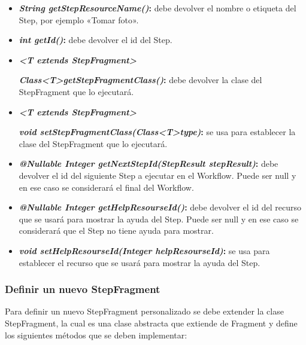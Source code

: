 \begin{itemize} 
  \item \textbf{\textit{String getStepResourceName()}:} debe devolver el nombre o etiqueta del Step, por ejemplo «Tomar foto».
  
  \item \textbf{\textit{int getId()}:} debe devolver el id del Step.
  
  
  \item \textbf{\textit{ \textless T extends StepFragment\textgreater }} 
  
   \textbf{\textit{Class\textless T\textgreater   getStepFragmentClass()}:}  debe devolver la clase del StepFragment que lo ejecutará.
    
    
  \item \textbf{\textit{ \textless T extends StepFragment\textgreater }} 
  
   \textbf{\textit{void setStepFragmentClass(Class\textless T\textgreater type)}:} se usa para establecer la clase del StepFragment que lo ejecutará.
  
  
  \item \textbf{\textit{@Nullable Integer getNextStepId(StepResult stepResult)}:}  debe devolver el id del siguiente Step a ejecutar en el Workflow. Puede ser null y en ese caso se considerará el final del Workflow.
    
    
  \item \textbf{\textit{@Nullable Integer getHelpResourseId()}:}   debe devolver el id del recurso que se usará para mostrar la ayuda del Step. Puede ser null y en ese caso se considerará que el Step no tiene ayuda para mostrar.
  
  \item \textbf{\textit{void setHelpResourseId(Integer helpResourseId)}:}   se usa para establecer el recurso que se usará para mostrar la ayuda del Step.

\end{itemize}


\subsubsection{Definir un nuevo StepFragment}
Para definir un nuevo StepFragment personalizado se debe extender la clase StepFragment, la cual es una clase abstracta que extiende de Fragment y define los siguientes métodos que se deben implementar:

